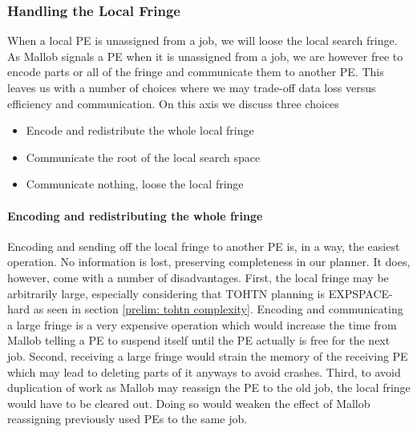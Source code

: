 \subsubsection{Handling the Local Fringe}
When a local PE is unassigned from a job, we will loose the local search fringe. As Mallob signals a PE when it is unassigned from a job, we are however free to encode parts or all of the fringe and communicate them to another PE. This leaves us with a number of choices where we may trade-off data loss versus efficiency and communication. On this axis we discuss three choices
\begin{itemize}
	\item Encode and redistribute the whole local fringe
	\item Communicate the root of the local search space
	\item Communicate nothing, loose the local fringe
\end{itemize}

\paragraph{Encoding and redistributing the whole fringe}
Encoding and sending off the local fringe to another PE is, in a way, the easiest operation. No information is lost, preserving completeness in our planner. It does, however, come with a number of disadvantages. First, the local fringe may be arbitrarily large, especially considering that TOHTN planning is EXPSPACE-hard as seen in section \ref{prelim: tohtn complexity}. Encoding and communicating a large fringe is a very expensive operation which would increase the time from Mallob telling a PE to suspend itself until the PE actually is free for the next job. Second, receiving a large fringe would strain the memory of the receiving PE which may lead to deleting parts of it anyways to avoid crashes. Third, to avoid duplication of work as Mallob may reassign the PE to the old job, the local fringe would have to be cleared out. Doing so would weaken the effect of Mallob reassigning previously used PEs to the same job.
\begin{comment}
- the most complete operation
- nothing is lost
- nodes higher up in the tree of PEs may be more strained now (depending on the communication pattern)
- a very expensive operation
- take care to delete the local fringe to avoid duplication!
\end{comment}

